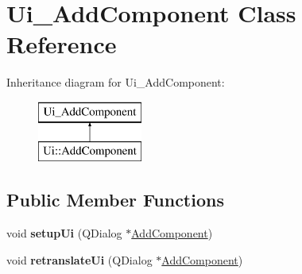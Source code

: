 \hypertarget{classUi__AddComponent}{\section{Ui\-\_\-\-Add\-Component Class Reference}
\label{classUi__AddComponent}
}
Inheritance diagram for Ui\-\_\-\-Add\-Component\-:\begin{figure}[H]
\begin{center}
\leavevmode
\includegraphics[height=2.000000cm]{classUi__AddComponent}
\end{center}
\end{figure}
\subsection*{Public Member Functions}
\begin{DoxyCompactItemize}
\item 
\hypertarget{classUi__AddComponent_acf348ed66a9a67dcc458ee2cbd809028}{void {\bfseries setup\-Ui} (Q\-Dialog $\ast$\hyperlink{classAddComponent}{Add\-Component})}\label{classUi__AddComponent_acf348ed66a9a67dcc458ee2cbd809028}

\item 
\hypertarget{classUi__AddComponent_a90f2c20d4af541e7d5f847df2edde6da}{void {\bfseries retranslate\-Ui} (Q\-Dialog $\ast$\hyperlink{classAddComponent}{Add\-Component})}\label{classUi__AddComponent_a90f2c20d4af541e7d5f847df2edde6da}

\end{DoxyCompactItemize}
